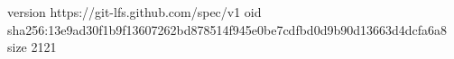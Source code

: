 version https://git-lfs.github.com/spec/v1
oid sha256:13e9ad30f1b9f13607262bd878514f945e0be7cdfbd0d9b90d13663d4dcfa6a8
size 2121
